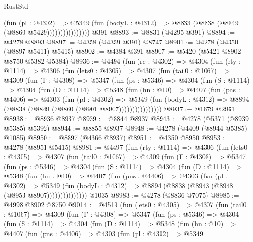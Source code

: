 \begin{lexlean}{RustStd}
\begin{coremodule}
{\begin{coremodule}
{{{{{{{{{{{{{{{{{{{{{{{{{{{{{{{{{{{                          (fun (pl : @4302) =>
                          @5349
                            (fun (bodyL : @4312) => @8833 (@8838 (@8849 (@8860 @5429))))))))))))))))
    @391
@8893 := @8831 (@4295 @391)
@8894 := @4278 @8893
@8897 := @4358 (@4359 @391) @8747
@8901 := @4278 (@4350 (@8897 @5411) @5415)
@8902 := @4384 @391
@8907 := @5420 (@5421 @8902 @8750 @5382 @5384)
@8936 := @4494
    (fun (rc : @4302) =>
    @4304
      (fun (rty : @1114) =>
      @4306
        (fun (lets0 : @4305) =>
        @4307
          (fun (tail0 : @1067) =>
          @4309
            (fun (Γ : @4308) =>
            @5347
              (fun (ps : @5346) =>
              @4304
                (fun (S : @1114) =>
                @4304
                  (fun (D : @1114) =>
                  @5348
                    (fun (hn : @10) =>
                    @4407
                      (fun (pns : @4406) =>
                      @4303
                        (fun (pl : @4302) =>
                        @5349
                          (fun (bodyL : @4312) =>
                          @8894 (@8838 (@8849 (@8860 (@8901 @8907))))))))))))))))
@8937 := @1679 @2961
@8938 := @8936 @8937
@8939 := @8844 @8937
@8943 := @4278 (@5371 (@8939 @5385) @5392)
@8944 := @8855 @8937
@8948 := @4278 (@4409 (@8944 @5385) @1085)
@8950 := @8897 (@4366 @8937)
@8951 := @4350 @8950
@8953 := @4278 (@8951 @5415)
@8981 := @4497
    (fun (rty : @1114) =>
    @4306
      (fun (lets0 : @4305) =>
      @4307
        (fun (tail0 : @1067) =>
        @4309
          (fun (Γ : @4308) =>
          @5347
            (fun (ps : @5346) =>
            @4304
              (fun (S : @1114) =>
              @4304
                (fun (D : @1114) =>
                @5348
                  (fun (hn : @10) =>
                  @4407
                    (fun (pns : @4406) =>
                    @4303
                      (fun (pl : @4302) =>
                      @5349
                        (fun (bodyL : @4312) =>
                        @8894 (@8838 (@8943 (@8948 (@8953 @8907)))))))))))))))
    @1035
@8983 := @4278 (@8836 @7075)
@8985 := @4998 @8902 @8750
@9014 := @4519
    (fun (lets0 : @4305) =>
    @4307
      (fun (tail0 : @1067) =>
      @4309
        (fun (Γ : @4308) =>
        @5347
          (fun (ps : @5346) =>
          @4304
            (fun (S : @1114) =>
            @4304
              (fun (D : @1114) =>
              @5348
                (fun (hn : @10) =>
                @4407
                  (fun (pns : @4406) =>
                  @4303
                    (fun (pl : @4302) =>
                    @5349
}}}}}}}}}}}}}}}}}}}}}}}}}}}}}}}}}}}
\end{coremodule}}
\end{coremodule}
\end{lexlean}
